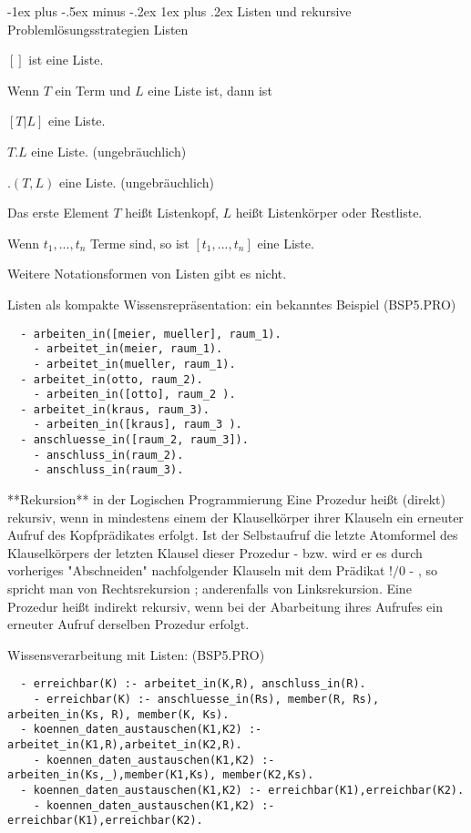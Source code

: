 \documentclass[a4paper]{article}
\makeatletter
\renewcommand{\subsubsection}{\@startsection{subsubsection}{3}{0mm}%
                {-1ex plus -.5ex minus -.2ex}%
                {1ex plus .2ex}%
                {\normalfont\small\bfseries}}
\makeatother
\begin{document}
\begin{multicols}{3}
  \subsubsection{Listen und rekursive Problemlösungsstrategien}
  Listen
  \begin{enumerate*}
    \item $[]$ ist eine Liste.
    \item Wenn $T$ ein Term und $L$ eine Liste ist, dann ist
    \begin{enumerate*}
      \item $[T|L]$ eine Liste.
      \item $T.L$ eine Liste. (ungebräuchlich)
      \item $.(T,L)$ eine Liste. (ungebräuchlich)
      \item Das erste Element $T$ heißt Listenkopf, $L$ heißt Listenkörper oder Restliste.
    \end{enumerate*}
    \item Wenn $t_1, ... ,t_n$ Terme sind, so ist $[t_1,...,t_n]$ eine Liste.
    \item Weitere Notationsformen von Listen gibt es nicht.
  \end{enumerate*}

  Listen als kompakte Wissensrepräsentation: ein bekanntes Beispiel (BSP5.PRO)
  \begin{lstlisting}
  - arbeiten_in([meier, mueller], raum_1).
    - arbeitet_in(meier, raum_1).
    - arbeitet_in(mueller, raum_1).
  - arbeitet_in(otto, raum_2).
    - arbeiten_in([otto], raum_2 ).
  - arbeitet_in(kraus, raum_3).
    - arbeiten_in([kraus], raum_3 ).
  - anschluesse_in([raum_2, raum_3]).
    - anschluss_in(raum_2).
    - anschluss_in(raum_3).
  \end{lstlisting}

  **Rekursion** in der Logischen Programmierung
  Eine Prozedur heißt (direkt) rekursiv, wenn in mindestens einem der Klauselkörper ihrer Klauseln ein erneuter Aufruf des Kopfprädikates erfolgt.
  Ist der Selbstaufruf die letzte Atomformel des Klauselkörpers der letzten Klausel dieser Prozedur - bzw. wird er es durch vorheriges "Abschneiden" nachfolgender
  Klauseln mit dem Prädikat $!/0$ - , so spricht man von Rechtsrekursion ; anderenfalls von Linksrekursion.
  Eine Prozedur heißt indirekt rekursiv, wenn bei der Abarbeitung ihres Aufrufes ein erneuter Aufruf derselben Prozedur erfolgt.

  Wissensverarbeitung mit Listen: (BSP5.PRO)
  \begin{lstlisting}
  - erreichbar(K) :- arbeitet_in(K,R), anschluss_in(R).
    - erreichbar(K) :- anschluesse_in(Rs), member(R, Rs), arbeiten_in(Ks, R), member(K, Ks).
  - koennen_daten_austauschen(K1,K2) :- arbeitet_in(K1,R),arbeitet_in(K2,R).
    - koennen_daten_austauschen(K1,K2) :- arbeiten_in(Ks,_),member(K1,Ks), member(K2,Ks).
  - koennen_daten_austauschen(K1,K2) :- erreichbar(K1),erreichbar(K2).
    - koennen_daten_austauschen(K1,K2) :- erreichbar(K1),erreichbar(K2).
  \end{lstlisting}


\end{multicols}
\end{document}
